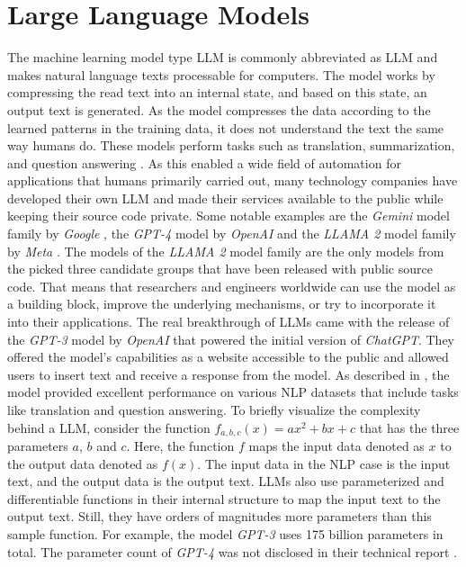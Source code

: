 \documentclass[draft,final]{thesisclass} %
\begin{document}
\section{Large Language Models}
The machine learning model type \gls{LLM} is commonly abbreviated as \acs{LLM} and makes natural language texts processable for computers.
The model works by compressing the read text into an internal state, and based on this state, an output text is generated.
As the model compresses the data according to the learned patterns in the training data, it does not understand the text the same way humans do.
These models perform tasks such as translation, summarization, and question answering \parencite[1]{llm_literature_review}.
As this enabled a wide field of automation for applications that humans primarily carried out, many technology companies have developed their own \acs{LLM} and made their services available to the public while keeping their source code private.
Some notable examples are the \textit{Gemini} model family by \textit{Google} \parencite{gemini}, the \textit{GPT-4} model by \textit{OpenAI} \parencite{gpt4} and the \textit{LLAMA 2} model family by \textit{Meta} \parencite{llama2}.
The models of the \textit{LLAMA 2} model family are the only models from the picked three candidate groups that have been released with public source code.
That means that researchers and engineers worldwide can use the model as a building block, improve the underlying mechanisms, or try to incorporate it into their applications.
The real breakthrough of \acs{LLM}s came with the release of the \textit{GPT-3} model by \textit{OpenAI} \parencite{gpt3} that powered the initial version of \textit{ChatGPT}.
They offered the model's capabilities as a website accessible to the public and allowed users to insert text and receive a response from the model.
As described in \textcite[1]{gpt3}, the model provided excellent performance on various \acs{NLP} datasets that include tasks like translation and question answering.
To briefly visualize the complexity behind a \acs{LLM}, consider the function $f_{a,b,c}(x) = ax^2+bx+c$ that has the three parameters $a$, $b$ and $c$.
Here, the function $f$ maps the input data denoted as $x$ to the output data denoted as $f(x)$.
The input data in the \acs{NLP} case is the input text, and the output data is the output text.
\acs{LLM}s also use parameterized and differentiable functions in their internal structure to map the input text to the output text. Still, they have orders of magnitudes more parameters than this sample function.
For example, the model \textit{GPT-3} uses 175 billion parameters \parencite[1]{gpt3} in total. The parameter count of \textit{GPT-4} was not disclosed in their technical report \parencite{gpt4}.
\end{document}
